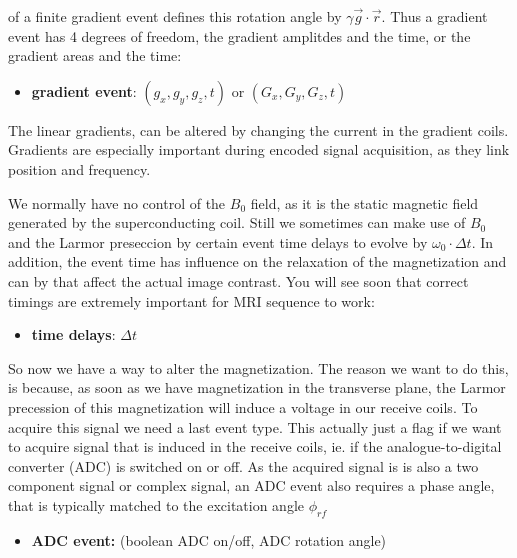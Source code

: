 \documentclass[a4paper,12pt]{extarticle}
\begin{document}

of a finite gradient event defines this rotation angle by $\gamma \vec{g}\cdot \vec{r}$. Thus a gradient event has 4 degrees of freedom, the gradient amplitdes and the time, or the gradient areas and the time:

\begin{itemize}
\item \textbf{gradient event}:  $(g_x, g_y, g_z, t)$  or $(G_x, G_y, G_z,t)$
\end{itemize}
The linear gradients, can be altered by changing the current in the gradient coils. Gradients are especially important during encoded signal acquisition, as they link position and frequency.

We normally have no control of the $B_0$ field, as it is the static magnetic field generated by the superconducting coil. Still we sometimes can make use of $B_0$ and the Larmor preseccion by certain event time delays to evolve by $\omega_0\cdot \Delta t$.  In addition, the event time has influence on the relaxation of the magnetization and can by that affect the actual image contrast. You will see soon that correct timings are extremely important for MRI sequence to work:

\begin{itemize}
\item \textbf{time delays}: $\Delta t$ 
\end{itemize}

So now we have a way to alter the magnetization. The reason we want to do this, is because, as soon as we have magnetization in the transverse plane, the Larmor precession of this magnetization will induce a voltage in our receive coils.  To acquire this signal we need a last event type. This actually just a flag if we want to acquire signal that is induced in the receive coils, ie. if the analogue-to-digital converter (ADC) is switched on or off. As the acquired signal is is also a two component signal or complex signal, an ADC event also requires a phase angle, that is typically matched to the excitation angle $\phi_{rf}$
\begin{itemize}
\item \textbf{ADC event:} (boolean  ADC on/off, ADC rotation angle)
\end{itemize}
\end{document}
